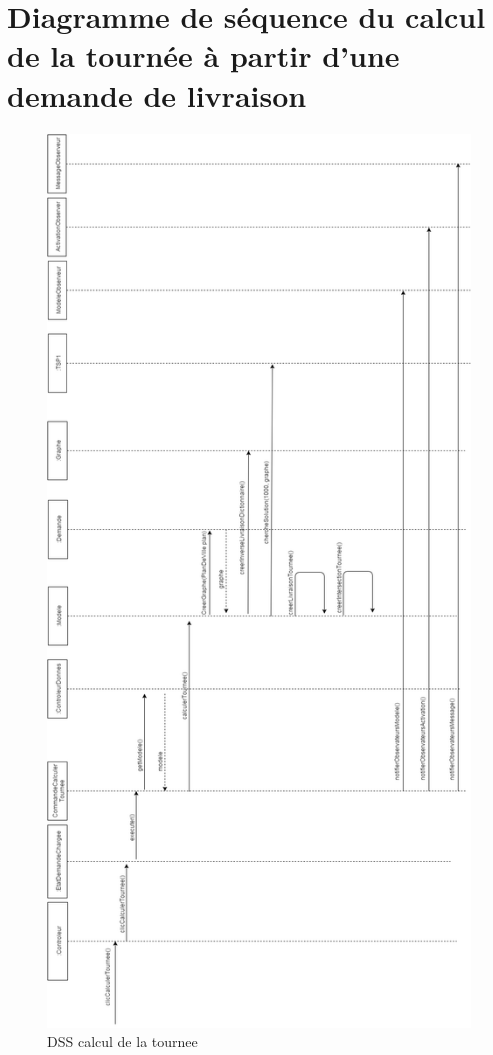\documentclass[10pt,a4paper]{book}
\begin{document}
\section{Diagramme de séquence du calcul de la tournée à partir d'une demande de livraison}
\begin{figure}[h!]
    \centering
    \includegraphics[scale=0.28]{tournee2.png}
    \caption{DSS calcul de la tournee}
\end{figure}
\end{document}
